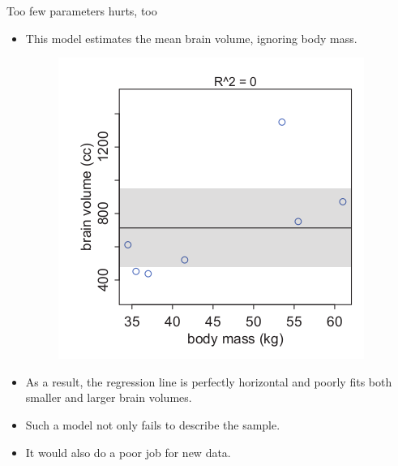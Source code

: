 \documentclass[handout]{beamer}
\begin{document}
\begin{frame}[fragile]{Too few parameters hurts, too}
\scriptsize{

\begin{itemize}


\item This model estimates the mean brain volume, ignoring body mass.


\begin{figure}[h!]
	\centering
	\includegraphics[scale=0.41]{pics/regconstant.png}
\end{figure}

\item As a result, the regression line is perfectly horizontal and poorly fits both smaller and larger brain volumes.

\item Such a model not only fails to describe the sample.

\item It would also do a poor job for new data.

\end{itemize}


} 
\end{frame}
\end{document}
